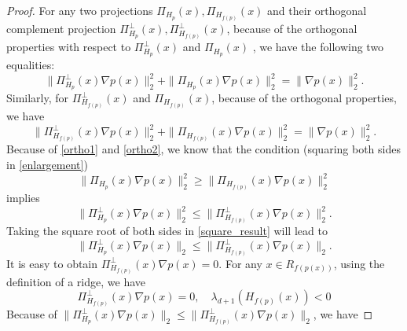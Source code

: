 \documentclass[aos,preprint]{imsart}
\theoremstyle{remark}
\begin{document}
\begin{appendix}
\begin{proof}
For any two projections $\Pi_{H_p}(x), \Pi_{H_{f(p)}}(x)$ and their orthogonal complement projection $\Pi^\perp_{H_p}(x), \Pi^\perp_{H_{f(p)}}(x)$, because of the orthogonal properties with respect to $\Pi_{H_p}^{\perp}(x)$ and $\Pi_{H_p}(x)$ , we have the following two equalities:
\begin{equation}\label{ortho1}
\|\Pi_{H_p}^{\perp}(x) \nabla p(x)\|_2^2 +\|\Pi_{H_p}(x) \nabla p(x)\|_2^2 = \|\nabla p(x)\|_2^2.
\end{equation}
Similarly, for $\Pi_{H_{f(p)}}^{\perp}(x)$ and $\Pi_{H_{f(p)}}(x)$, because of the orthogonal properties, we have
\begin{equation}\label{ortho2}
\|\Pi_{H_{f(p)}}^{\perp}(x) \nabla p(x)\|_2^2 +\|\Pi_{H_{f(p)}}(x) \nabla p(x)\|_2^2 = \|\nabla p(x)\|_2^2.
\end{equation}
Because of \eqref{ortho1} and \eqref{ortho2}, we know that the condition (squaring both sides in \eqref{enlargement})
 \[
\|\Pi_{H_p}(x)\nabla p(x)\|_2^2 \geq \|\Pi_{H_{f(p)}}(x)\nabla p(x)\|_2^2
\] 
implies
\begin{equation}\label{square_result}
\|\Pi_{H_p}^{\perp}(x)\nabla p(x)\|_2^2 \leq \|\Pi_{H_{f(p)}}^{\perp}(x)\nabla p(x)\|_2^2.
\end{equation}
Taking the square root of both sides in \eqref{square_result} will lead to
\begin{equation}\label{llll}
\|\Pi_{H_p}^{\perp}(x)\nabla p(x)\|_2 \leq \|\Pi_{H_{f(p)}}^{\perp}(x)\nabla p(x)\|_2.
\end{equation}
It is easy to obtain $\Pi_{H_{f(p)}}^{\perp}(x)\nabla p(x) = 0$. For any $x\in R_{f(p(x))}$, using the definition of a ridge, we have 
\[
 \Pi_{H_{f(p)}}^{\perp} (x) \nabla p(x) = 0,\quad \lambda_{d+1}(H_{f(p)}(x))<0
\] %
Because of $\|\Pi_{H_p}^\perp(x)\nabla p(x)\|_2 \leq \|\Pi_{H_{f(p)}}^{\perp}(x)\nabla p(x)\|_2$, we have 

\end{proof}
\end{appendix}
\end{document}
